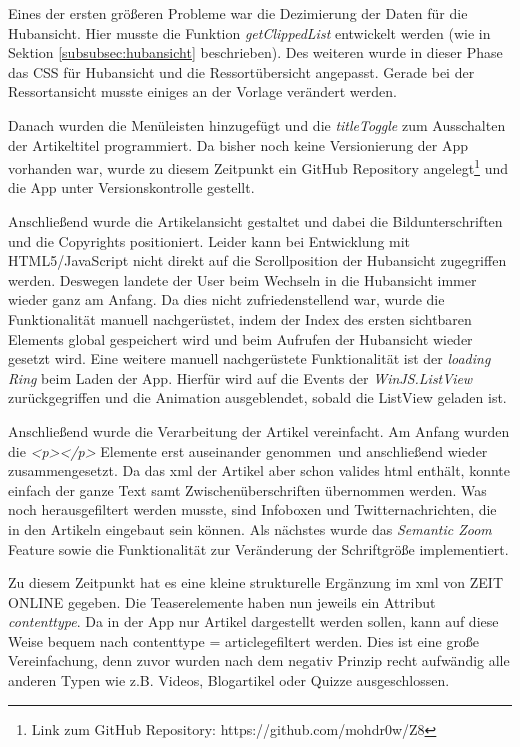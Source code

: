 \documentclass[12pt,a4paper,bibtotoc,abstracton]{scrartcl}
\begin{document}
Eines der ersten größeren Probleme war die Dezimierung der Daten für die Hubansicht. Hier musste die Funktion \textit{getClippedList} entwickelt werden (wie in Sektion \ref{subsubsec:hubansicht} beschrieben). Des weiteren wurde in dieser Phase das CSS für Hubansicht und die Ressortübersicht angepasst. Gerade bei der Ressortansicht musste einiges an der Vorlage verändert werden.

Danach wurden die Menüleisten hinzugefügt  und die \textit{titleToggle} zum Ausschalten der Artikeltitel programmiert. Da bisher noch keine Versionierung der App vorhanden war, wurde zu diesem Zeitpunkt ein GitHub Repository angelegt\footnote{Link zum GitHub Repository: https://github.com/mohdr0w/Z8} und die App unter Versionskontrolle gestellt. 

Anschließend wurde die Artikelansicht gestaltet und dabei die Bildunterschriften und die Copyrights positioniert. Leider kann bei Entwicklung mit HTML5/JavaScript nicht direkt auf die Scrollposition der Hubansicht zugegriffen werden. Deswegen landete der User beim Wechseln in die Hubansicht immer wieder ganz am Anfang. Da dies nicht zufriedenstellend war, wurde die Funktionalität manuell nachgerüstet, indem der Index des ersten sichtbaren Elements global gespeichert wird und beim Aufrufen der Hubansicht wieder gesetzt wird. Eine weitere manuell nachgerüstete Funktionalität ist der \textit{loading Ring} beim Laden der App. Hierfür wird auf die Events der \textit{WinJS.ListView} zurückgegriffen und die Animation ausgeblendet, sobald die ListView geladen ist.

Anschließend wurde die Verarbeitung der Artikel vereinfacht. Am Anfang wurden die \textit{<p></p>} Elemente erst \glqq auseinander genommen\grqq\ und anschließend wieder zusammengesetzt. Da das \ac{xml} der Artikel aber schon valides \ac{html} enthält, konnte einfach der ganze Text samt Zwischenüberschriften übernommen werden. Was noch herausgefiltert werden musste, sind Infoboxen und Twitternachrichten, die in den Artikeln eingebaut sein können. Als nächstes wurde das \textit{Semantic Zoom} Feature sowie die Funktionalität zur Veränderung der Schriftgröße implementiert.   

Zu diesem Zeitpunkt hat es eine kleine strukturelle Ergänzung im \ac{xml} von ZEIT ONLINE gegeben. Die Teaserelemente haben nun jeweils ein Attribut \textit{contenttype}. Da in der App nur Artikel dargestellt werden sollen, kann auf diese Weise bequem nach \glqq contenttype = article\grqq gefiltert werden. Dies ist eine große Vereinfachung, denn zuvor wurden nach dem negativ Prinzip recht aufwändig alle anderen Typen wie z.B. Videos, Blogartikel oder Quizze ausgeschlossen.  
\end{document}
